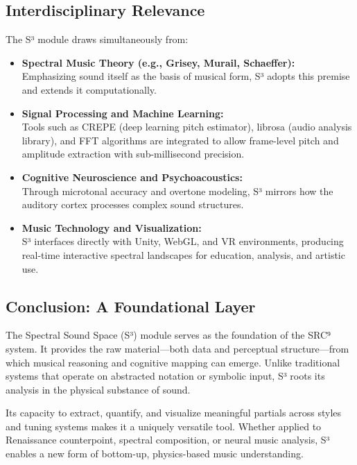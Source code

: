 \subsection*{Interdisciplinary Relevance}

The S³ module draws simultaneously from:

\begin{itemize}
    \item \textbf{Spectral Music Theory (e.g., Grisey, Murail, Schaeffer):}\\
    Emphasizing sound itself as the basis of musical form, S³ adopts this premise and extends it computationally.

    \item \textbf{Signal Processing and Machine Learning:}\\
    Tools such as CREPE (deep learning pitch estimator), librosa (audio analysis library), and FFT algorithms are integrated to allow frame-level pitch and amplitude extraction with sub-millisecond precision.

    \item \textbf{Cognitive Neuroscience and Psychoacoustics:}\\
    Through microtonal accuracy and overtone modeling, S³ mirrors how the auditory cortex processes complex sound structures.

    \item \textbf{Music Technology and Visualization:}\\
    S³ interfaces directly with Unity, WebGL, and VR environments, producing real-time interactive spectral landscapes for education, analysis, and artistic use.
\end{itemize}

\subsection*{Conclusion: A Foundational Layer}

The Spectral Sound Space (S³) module serves as the foundation of the SRC⁹ system. It provides the raw material—both data and perceptual structure—from which musical reasoning and cognitive mapping can emerge. Unlike traditional systems that operate on abstracted notation or symbolic input, S³ roots its analysis in the physical substance of sound.

Its capacity to extract, quantify, and visualize meaningful partials across styles and tuning systems makes it a uniquely versatile tool. Whether applied to Renaissance counterpoint, spectral composition, or neural music analysis, S³ enables a new form of bottom-up, physics-based music understanding.

